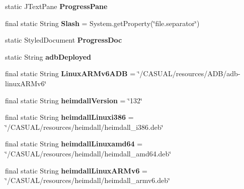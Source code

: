 \begin{DoxyCompactItemize}
\item 
\hypertarget{classCASUAL_1_1Statics_aec7cc86cfbee70918b28ea9a28271a69}{static J\-Text\-Pane {\bfseries Progress\-Pane}}\label{classCASUAL_1_1Statics_aec7cc86cfbee70918b28ea9a28271a69}

\item 
\hypertarget{classCASUAL_1_1Statics_a7fb8b9b72cffe2705ace247590b4c86a}{final static String {\bfseries Slash} = System.\-get\-Property(\char`\"{}file.\-separator\char`\"{})}\label{classCASUAL_1_1Statics_a7fb8b9b72cffe2705ace247590b4c86a}

\item 
\hypertarget{classCASUAL_1_1Statics_aeb0cd12880f2020c5428d9460fbeddf3}{static Styled\-Document {\bfseries Progress\-Doc}}\label{classCASUAL_1_1Statics_aeb0cd12880f2020c5428d9460fbeddf3}

\item 
\hypertarget{classCASUAL_1_1Statics_a9b53a6ce0843c552c8bf27468e7b70dd}{static String {\bfseries adb\-Deployed}}\label{classCASUAL_1_1Statics_a9b53a6ce0843c552c8bf27468e7b70dd}

\item 
\hypertarget{classCASUAL_1_1Statics_a27d06799ed9b752d2343824cca691d03}{final static String {\bfseries Linux\-A\-R\-Mv6\-A\-D\-B} = \char`\"{}/C\-A\-S\-U\-A\-L/resources/A\-D\-B/adb-\/linux\-A\-R\-Mv6\char`\"{}}\label{classCASUAL_1_1Statics_a27d06799ed9b752d2343824cca691d03}

\item 
\hypertarget{classCASUAL_1_1Statics_aac4d41d12b8096aba6a072e553231368}{final static String {\bfseries heimdall\-Version} = \char`\"{}132\char`\"{}}\label{classCASUAL_1_1Statics_aac4d41d12b8096aba6a072e553231368}

\item 
\hypertarget{classCASUAL_1_1Statics_a5995018bb372d39867345272da4c8816}{final static String {\bfseries heimdall\-Linuxi386} = \char`\"{}/C\-A\-S\-U\-A\-L/resources/heimdall/heimdall\-\_\-i386.\-deb\char`\"{}}\label{classCASUAL_1_1Statics_a5995018bb372d39867345272da4c8816}

\item 
\hypertarget{classCASUAL_1_1Statics_aa9a7be1e6c5831ab718a999060127a01}{final static String {\bfseries heimdall\-Linuxamd64} = \char`\"{}/C\-A\-S\-U\-A\-L/resources/heimdall/heimdall\-\_\-amd64.\-deb\char`\"{}}\label{classCASUAL_1_1Statics_aa9a7be1e6c5831ab718a999060127a01}

\item 
\hypertarget{classCASUAL_1_1Statics_af22e3d2c21a91dff14f3ae4aa4bbed13}{final static String {\bfseries heimdall\-Linux\-A\-R\-Mv6} = \char`\"{}/C\-A\-S\-U\-A\-L/resources/heimdall/heimdall\-\_\-armv6.\-deb\char`\"{}}\label{classCASUAL_1_1Statics_af22e3d2c21a91dff14f3ae4aa4bbed13}


\end{DoxyCompactItemize}
